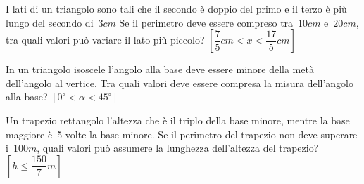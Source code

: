 \begin{multicols}{2}
 \begin{esercizio}[\Ast]
 \label{ese:21.29}
 I lati di un triangolo sono tali che il secondo è doppio del primo e
il terzo è più lungo del secondo di~$3\unit{cm}$ Se il perimetro deve
essere compreso tra~$10\unit{cm}$ e~$20\unit{cm}$, tra quali valori può variare 
il lato
più piccolo? \hfill 
$\left[\dfrac{7}{5}\unit{cm}<x<\dfrac{17}{5}\unit{cm}\right]$
 \end{esercizio}

 \begin{esercizio}[\Ast]
 \label{ese:21.30}
 In un triangolo isoscele l'angolo
alla base deve essere minore della metà dell'angolo
al vertice. Tra quali valori deve essere compresa la misura
dell'angolo alla base? \hfill $\left[0^{\circ}<\alpha<45^{\circ}\right]$
 \end{esercizio}

 \begin{esercizio}[\Ast]
 \label{ese:21.31}
 Un trapezio rettangolo l'altezza che è il triplo
della base minore, mentre la base maggiore è~5 volte la base minore.
Se il perimetro del trapezio non deve superare i~$100\unit{m}$, quali valori
può assumere la lunghezza dell'altezza del
trapezio? \hfill $\left[h\le \dfrac{150}{7}m\right]$
 \end{esercizio}

\end{multicols}

